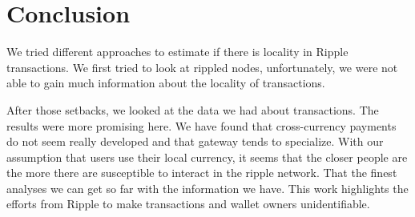 \section{Conclusion}
We tried different approaches to estimate if there is locality in Ripple transactions. We first tried to look at rippled nodes, unfortunately, we were not able to gain much information about the locality of transactions. 

After those setbacks, we looked at the data we had about transactions. The results were more promising here. We have found that cross-currency payments do not seem really developed and that gateway tends to specialize. With our assumption that users use their local currency, it seems that the closer people are the more there are susceptible to interact in the ripple network. That the finest analyses we can get so far with the information we have. This work highlights the efforts from Ripple to make transactions and wallet owners unidentifiable.